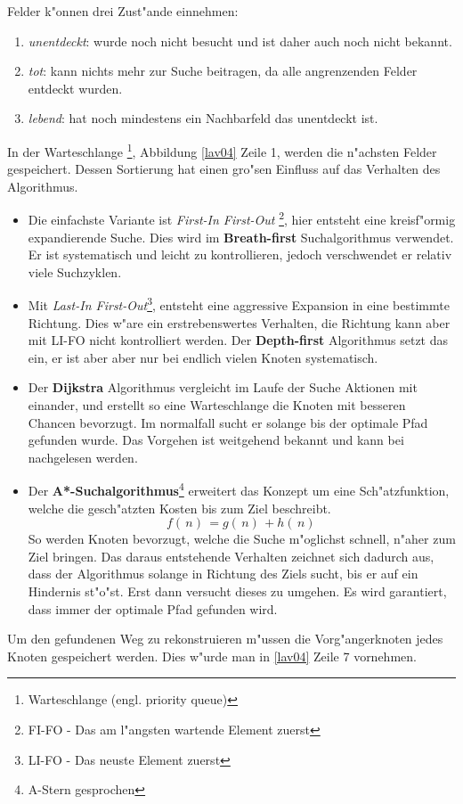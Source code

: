 Felder k"onnen drei Zust"ande einnehmen:
\begin{enumerate}

\item \textit{unentdeckt}: wurde noch nicht besucht und ist daher auch noch nicht bekannt.
\item \textit{tot}: kann nichts mehr zur Suche beitragen, da alle angrenzenden Felder entdeckt wurden.
\item \textit{lebend}: hat noch mindestens ein Nachbarfeld das unentdeckt ist.  
\end{enumerate} \cite[~S. 33]{Lav06}


In der Warteschlange \footnote{Warteschlange (engl. priority queue)}, Abbildung \ref{lav04} Zeile 1, werden die n"achsten Felder gespeichert. Dessen Sortierung hat einen gro"sen Einfluss auf das Verhalten des Algorithmus. 
	\begin{itemize}
		\item Die einfachste Variante ist \textit{First-In First-Out} \footnote{FI-FO - Das am l"angsten wartende Element zuerst}, hier entsteht eine kreisf"ormig expandierende Suche. Dies wird im \textbf{Breath-first} Suchalgorithmus verwendet. Er ist systematisch und leicht zu kontrollieren, jedoch verschwendet er relativ viele Suchzyklen.\cite[~S. 35]{Lav06}
		\item Mit \textit{Last-In First-Out}\footnote{LI-FO - Das neuste Element zuerst}, entsteht eine aggressive Expansion in eine bestimmte Richtung. 
		Dies w"are ein erstrebenswertes Verhalten, die Richtung kann aber mit LI-FO nicht kontrolliert werden. Der \textbf{Depth-first} Algorithmus setzt das ein, er ist aber aber nur bei endlich vielen Knoten systematisch. \cite[~S. 36]{Lav06}
		\item Der \textbf{Dijkstra} Algorithmus vergleicht im Laufe der Suche Aktionen mit einander, und erstellt so eine Warteschlange die Knoten mit besseren Chancen bevorzugt. Im normalfall sucht er solange bis der optimale Pfad gefunden wurde. Das Vorgehen ist weitgehend bekannt und kann bei \cite[~S. 36]{Lav06} nachgelesen werden.
		\item Der \textbf{A*-Suchalgorithmus}\footnote{A-Stern gesprochen} erweitert das Konzept um eine Sch"atzfunktion, welche die gesch"atzten Kosten bis zum Ziel beschreibt.
		$$f( \, n ) \, = g ( \, n ) \, + h ( \, n ) \,$$
		So werden Knoten bevorzugt, welche die Suche m"oglichst schnell, n"aher zum Ziel bringen. Das daraus entstehende Verhalten zeichnet sich dadurch aus, dass der Algorithmus solange in Richtung des Ziels sucht, bis er auf ein Hindernis st"o"st. Erst dann versucht dieses zu umgehen. Es wird garantiert, dass immer der optimale Pfad gefunden wird.\cite[~S. 37]{Lav06}
	\end{itemize}
Um den gefundenen Weg zu rekonstruieren m"ussen die Vorg"angerknoten jedes Knoten gespeichert werden. Dies w"urde man in \ref{lav04} Zeile 7 vornehmen. 


